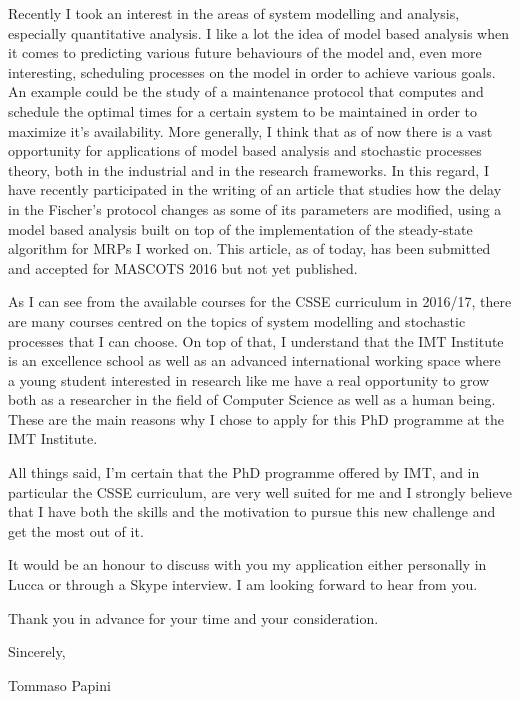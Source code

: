 \documentclass{article}
\begin{document}
    Recently I took an interest in the areas of system modelling and analysis, especially quantitative analysis. I like a lot the idea of model based analysis when it comes to predicting various future behaviours of the model and, even more interesting, scheduling processes on the model in order to achieve various goals. An example could be the study of a maintenance protocol that computes and schedule the optimal times for a certain system to be maintained in order to maximize it's availability. More generally, I think that as of now there is a vast opportunity for applications of model based analysis and stochastic processes theory, both in the industrial and in the research frameworks. In this regard, I have recently participated in the writing of an article that studies how the delay in the Fischer's protocol changes as some of its parameters are modified, using a model based analysis built on top of the implementation of the steady-state algorithm for MRPs I worked on. This article, as of today, has been submitted and accepted for MASCOTS 2016 but not yet published. \par \bigskip
    
    As I can see from the available courses for the CSSE curriculum in 2016/17, there are many courses centred on the topics of system modelling and stochastic processes that I can choose. On top of that, I understand that the IMT Institute is an excellence school as well as an advanced international working space where a young student interested in research like me have a real opportunity to grow both as a researcher in the field of Computer Science as well as a human being. These are the main reasons why I chose to apply for this PhD programme at the IMT Institute. \par \bigskip
    
    All things said, I'm certain that the PhD programme offered by IMT, and in particular the CSSE curriculum, are very well suited for me and I strongly believe that I have both the skills and the motivation to pursue this new challenge and get the most out of it. \par \bigskip
    
    It would be an honour to discuss with you my application either personally in Lucca or through a Skype interview. I am looking forward to hear from you. \par \bigskip
    
    Thank you in advance for your time and your consideration. \par \bigskip
    
    Sincerely, \par \medskip
    
    \qquad \qquad Tommaso Papini
\end{document}
